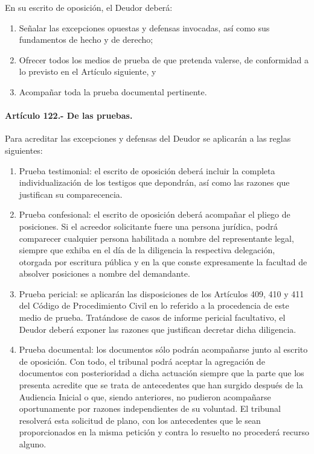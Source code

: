 \documentclass[
]{book}
\begin{document}
En su escrito de oposición, el Deudor deberá:

\begin{enumerate}
\def\labelenumi{\arabic{enumi})}
\item
  Señalar las excepciones opuestas y defensas invocadas, así como sus fundamentos de hecho y de derecho;
\item
  Ofrecer todos los medios de prueba de que pretenda valerse, de conformidad a lo previsto en el Artículo siguiente, y
\item
  Acompañar toda la prueba documental pertinente.
\end{enumerate}

\hypertarget{artuxedculo-122.--de-las-pruebas.}{%
\paragraph*{Artículo 122.- De las pruebas.}\label{artuxedculo-122.--de-las-pruebas.}}

Para acreditar las excepciones y defensas del Deudor se aplicarán a las reglas siguientes:

\begin{enumerate}
\def\labelenumi{\arabic{enumi})}
\item
  Prueba testimonial: el escrito de oposición deberá incluir la completa individualización de los testigos que depondrán, así como las razones que justifican su comparecencia.
\item
  Prueba confesional: el escrito de oposición deberá acompañar el pliego de posiciones. Si el acreedor solicitante fuere una persona jurídica, podrá comparecer cualquier persona habilitada a nombre del representante legal, siempre que exhiba en el día de la diligencia la respectiva delegación, otorgada por escritura pública y en la que conste expresamente la facultad de absolver posiciones a nombre del demandante.
\item
  Prueba pericial: se aplicarán las disposiciones de los Artículos 409, 410 y 411 del Código de Procedimiento Civil en lo referido a la procedencia de este medio de prueba. Tratándose de casos de informe pericial facultativo, el Deudor deberá exponer las razones que justifican decretar dicha diligencia.
\item
  Prueba documental: los documentos sólo podrán acompañarse junto al escrito de oposición. Con todo, el tribunal podrá aceptar la agregación de documentos con posterioridad a dicha actuación siempre que la parte que los presenta acredite que se trata de antecedentes que han surgido después de la Audiencia Inicial o que, siendo anteriores, no pudieron acompañarse oportunamente por razones independientes de su voluntad. El tribunal resolverá esta solicitud de plano, con los antecedentes que le sean proporcionados en la misma petición y contra lo resuelto no procederá recurso alguno.
\end{enumerate}
\end{document}
